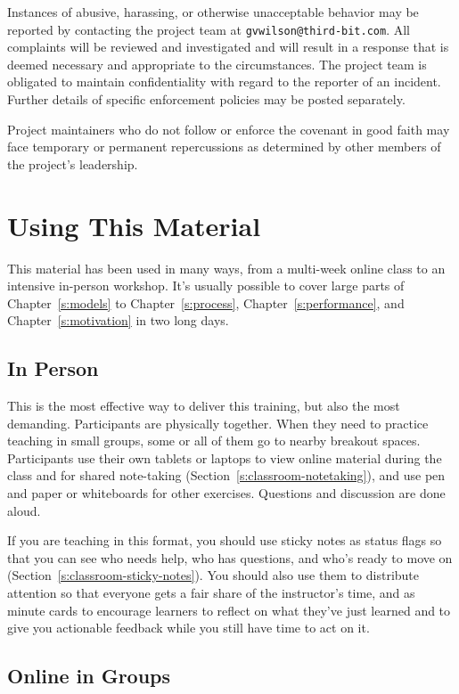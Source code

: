 Instances of abusive, harassing, or otherwise unacceptable behavior
may be reported by contacting the project team at
\texttt{gvwilson@third-bit.com}. All complaints will be
reviewed and investigated and will result in a response that is deemed
necessary and appropriate to the circumstances. The project team is
obligated to maintain confidentiality with regard to the reporter of
an incident. Further details of specific enforcement policies may be
posted separately.

Project maintainers who do not follow or enforce the covenant in good
faith may face temporary or permanent repercussions as determined by
other members of the project's leadership.

\section{Using This Material}\label{s:joining-using}

This material has been used in many ways, from a multi-week online
class to an intensive in-person workshop. It's usually possible to
cover large parts of Chapter~\ref{s:models} to Chapter~\ref{s:process},
Chapter~\ref{s:performance}, and Chapter~\ref{s:motivation} in two long
days.

\subsection{In Person}\label{in-person}

This is the most effective way to deliver this training, but also the
most demanding. Participants are physically together. When they need to
practice teaching in small groups, some or all of them go to nearby
breakout spaces. Participants use their own tablets or laptops to view
online material during the class and for shared note-taking
(Section~\ref{s:classroom-notetaking}), and use pen and paper or
whiteboards for other exercises. Questions and discussion are done
aloud.

If you are teaching in this format, you should use sticky notes as
status flags so that you can see who needs help, who has questions,
and who's ready to move on (Section~\ref{s:classroom-sticky-notes}). You
should also use them to distribute attention so that everyone gets a
fair share of the instructor's time, and as minute cards to encourage
learners to reflect on what they've just learned and to give you
actionable feedback while you still have time to act on it.

\subsection{Online in Groups}\label{online-in-groups}

